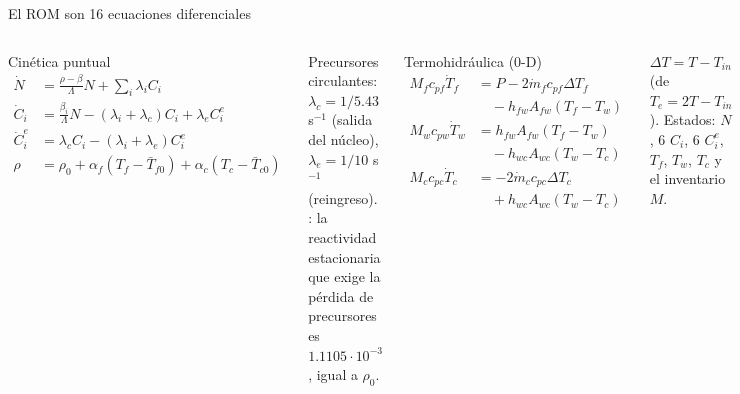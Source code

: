 \documentclass[aspectratio=169,10pt]{beamer}
\newcommand{\key}[1]{\leavevmode{\color{USMBlue}\bfseries #1}}
\newcommand{\md}{\dot m}
\begin{document}
\begin{frame}{El ROM son 16 ecuaciones diferenciales}
\begin{columns}[T]
\begin{block}{Cinética puntual}
\vspace{-.2cm}
{\small
\begin{align*}
\dot N&=\tfrac{\rho-\beta}{\Lambda}N+\textstyle\sum_i\lambda_iC_i\\
\dot C_i&=\tfrac{\beta_i}{\Lambda}N-(\lambda_i+\lambda_c)C_i+\lambda_eC^e_i\\
\dot C^e_i&=\lambda_cC_i-(\lambda_i+\lambda_e)C^e_i\\
\rho&=\rho_0+\alpha_f(T_f-\bar T_{f0})+\alpha_c(T_c-\bar T_{c0})
\end{align*}}
\end{block}
\small Precursores circulantes: $\lambda_c=1/5.43$ s$^{-1}$ (salida del núcleo), $\lambda_e=1/10$ s$^{-1}$ (reingreso). \key{Comprobación}: la reactividad estacionaria que exige la pérdida de precursores es $1.1105\cdot10^{-3}$, igual a $\rho_0$.
\begin{block}{Termohidráulica (0-D)}
\vspace{-.2cm}
{\small
\begin{align*}
M_fc_{pf}\dot T_f&=P-2\md_fc_{pf}\Delta T_f\\&\quad-h_{fw}A_{fw}(T_f-T_w)\\
M_wc_{pw}\dot T_w&=h_{fw}A_{fw}(T_f-T_w)\\&\quad-h_{wc}A_{wc}(T_w-T_c)\\
M_cc_{pc}\dot T_c&=-2\md_cc_{pc}\Delta T_c\\&\quad+h_{wc}A_{wc}(T_w-T_c)
\end{align*}}
\end{block}
\small $\Delta T=T-T_{in}$ (de $T_e=2T-T_{in}$). Estados: $N$, 6 $C_i$, 6 $C^e_i$, $T_f$, $T_w$, $T_c$ y el inventario $M$.
\end{columns}
\end{frame}
\end{document}
